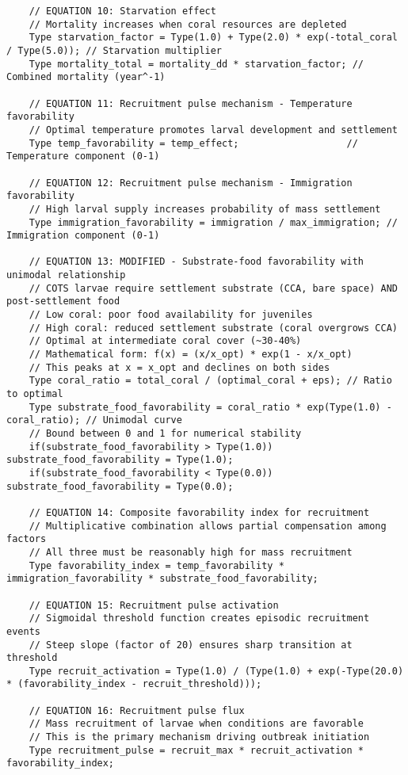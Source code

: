 \begin{lstlisting}
    // EQUATION 10: Starvation effect
    // Mortality increases when coral resources are depleted
    Type starvation_factor = Type(1.0) + Type(2.0) * exp(-total_coral / Type(5.0)); // Starvation multiplier
    Type mortality_total = mortality_dd * starvation_factor; // Combined mortality (year^-1)
    
    // EQUATION 11: Recruitment pulse mechanism - Temperature favorability
    // Optimal temperature promotes larval development and settlement
    Type temp_favorability = temp_effect;                   // Temperature component (0-1)
    
    // EQUATION 12: Recruitment pulse mechanism - Immigration favorability
    // High larval supply increases probability of mass settlement
    Type immigration_favorability = immigration / max_immigration; // Immigration component (0-1)
    
    // EQUATION 13: MODIFIED - Substrate-food favorability with unimodal relationship
    // COTS larvae require settlement substrate (CCA, bare space) AND post-settlement food
    // Low coral: poor food availability for juveniles
    // High coral: reduced settlement substrate (coral overgrows CCA)
    // Optimal at intermediate coral cover (~30-40%)
    // Mathematical form: f(x) = (x/x_opt) * exp(1 - x/x_opt)
    // This peaks at x = x_opt and declines on both sides
    Type coral_ratio = total_coral / (optimal_coral + eps); // Ratio to optimal
    Type substrate_food_favorability = coral_ratio * exp(Type(1.0) - coral_ratio); // Unimodal curve
    // Bound between 0 and 1 for numerical stability
    if(substrate_food_favorability > Type(1.0)) substrate_food_favorability = Type(1.0);
    if(substrate_food_favorability < Type(0.0)) substrate_food_favorability = Type(0.0);
    
    // EQUATION 14: Composite favorability index for recruitment
    // Multiplicative combination allows partial compensation among factors
    // All three must be reasonably high for mass recruitment
    Type favorability_index = temp_favorability * immigration_favorability * substrate_food_favorability;
    
    // EQUATION 15: Recruitment pulse activation
    // Sigmoidal threshold function creates episodic recruitment events
    // Steep slope (factor of 20) ensures sharp transition at threshold
    Type recruit_activation = Type(1.0) / (Type(1.0) + exp(-Type(20.0) * (favorability_index - recruit_threshold)));
    
    // EQUATION 16: Recruitment pulse flux
    // Mass recruitment of larvae when conditions are favorable
    // This is the primary mechanism driving outbreak initiation
    Type recruitment_pulse = recruit_max * recruit_activation * favorability_index;
    

\end{lstlisting}

